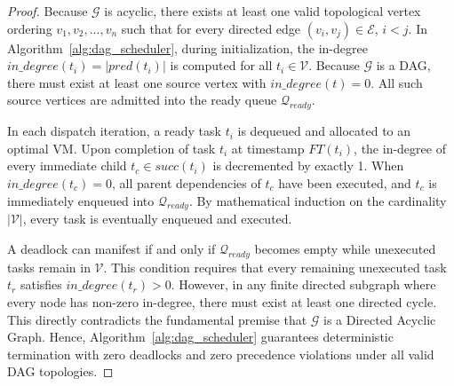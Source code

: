 \documentclass[default,sn-mathphys-num]{sn-jnl}
\theoremstyle{thmstyleone}
\theoremstyle{thmstyletwo}
\theoremstyle{thmstylethree}
\begin{document}
\begin{proof}
Because $\mathcal{G}$ is acyclic, there exists at least one valid topological vertex ordering $v_1, v_2, \dots, v_n$ such that for every directed edge $(v_i, v_j) \in \mathcal{E}$, $i < j$. In Algorithm~\ref{alg:dag_scheduler}, during initialization, the in-degree $in\_degree(t_i) = |pred(t_i)|$ is computed for all $t_i \in \mathcal{V}$. Because $\mathcal{G}$ is a DAG, there must exist at least one source vertex with $in\_degree(t) = 0$. All such source vertices are admitted into the ready queue $\mathcal{Q}_{ready}$.

In each dispatch iteration, a ready task $t_i$ is dequeued and allocated to an optimal VM. Upon completion of task $t_i$ at timestamp $FT(t_i)$, the in-degree of every immediate child $t_c \in succ(t_i)$ is decremented by exactly 1. When $in\_degree(t_c) = 0$, all parent dependencies of $t_c$ have been executed, and $t_c$ is immediately enqueued into $\mathcal{Q}_{ready}$. By mathematical induction on the cardinality $|\mathcal{V}|$, every task is eventually enqueued and executed. 

A deadlock can manifest if and only if $\mathcal{Q}_{ready}$ becomes empty while unexecuted tasks remain in $\mathcal{V}$. This condition requires that every remaining unexecuted task $t_r$ satisfies $in\_degree(t_r) > 0$. However, in any finite directed subgraph where every node has non-zero in-degree, there must exist at least one directed cycle. This directly contradicts the fundamental premise that $\mathcal{G}$ is a Directed Acyclic Graph. Hence, Algorithm~\ref{alg:dag_scheduler} guarantees deterministic termination with zero deadlocks and zero precedence violations under all valid DAG topologies.
\end{proof}
\end{document}
